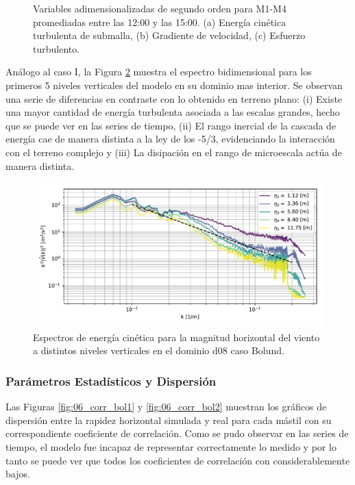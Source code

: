 \begin{figure}[H]
\begin{center}
	\end{center}
	\vspace{-5mm}
	\caption{Variables adimensionalizadas de segundo orden para M1-M4 promediadas entre las 12:00 y las 15:00. (a) Energía cinética turbulenta de submalla, (b) Gradiente de velocidad, (c) Esfuerzo turbulento. }
	\label{fig:06_bol_mean_secondorder}
\end{figure}
\vspace*{\fill}
\newpage
Análogo al caso I, la Figura \ref{fig:06_bol_spectrum} muestra el espectro bidimensional para los primeros 5 niveles verticales del modelo en su dominio mas interior. Se observan una serie de diferencias en contraste con lo obtenido en terreno plano: (i) Existe una mayor cantidad de energía turbulenta asociada a las escalas grandes, hecho que se puede ver en las series de tiempo, (ii) El rango inercial de la cascada de energía cae de manera distinta a la ley de los -5/3, evidenciando la interacción con el terreno complejo y (iii) La disipación en el rango de microescala actúa de manera distinta.

\begin{figure}[H]
	\centering
	\includegraphics[width=1.0\linewidth,page=1,trim={3mm 5mm 3mm 3mm},clip]{Imagenes/06/bol/spectra}%
	\caption{Espectros de energía cinética para la magnitud horizontal del viento a distintos niveles verticales en el dominio d08 caso Bolund.}
	\label{fig:06_bol_spectrum}
\end{figure}
\subsubsection{Parámetros Estadísticos y Dispersión}
Las Figuras \ref{fig:06_corr_bol1} y \ref{fig:06_corr_bol2} muestran los gráficos de dispersión entre la rapidez horizontal simulada y real para cada mástil con su correspondiente coeficiente de correlación. Como se pudo observar en las series de tiempo, el modelo fue incapaz de representar correctamente lo medido y por lo tanto se puede ver que todos los coeficientes de correlación con considerablemente bajos.

